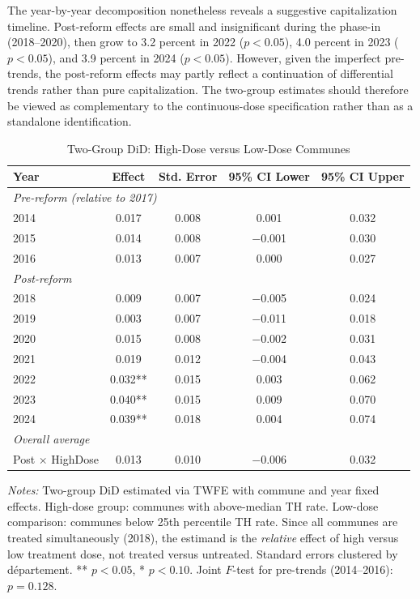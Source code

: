 \documentclass[12pt]{article}
\begin{document}
The year-by-year decomposition nonetheless reveals a suggestive capitalization timeline. Post-reform effects are small and insignificant during the phase-in (2018--2020), then grow to 3.2 percent in 2022 ($p < 0.05$), 4.0 percent in 2023 ($p < 0.05$), and 3.9 percent in 2024 ($p < 0.05$). However, given the imperfect pre-trends, the post-reform effects may partly reflect a continuation of differential trends rather than pure capitalization. The two-group estimates should therefore be viewed as complementary to the continuous-dose specification rather than as a standalone identification.

\begin{table}[H]
\centering
\caption{Two-Group DiD: High-Dose versus Low-Dose Communes}
\label{tab:cs_results}
\begin{tabular}{lcccc}
\toprule
Year & Effect & Std. Error & 95\% CI Lower & 95\% CI Upper \\
\midrule
\multicolumn{5}{l}{\emph{Pre-reform (relative to 2017)}} \\
2014 & 0.017 & 0.008 & 0.001 & 0.032 \\
2015 & 0.014 & 0.008 & $-$0.001 & 0.030 \\
2016 & 0.013 & 0.007 & 0.000 & 0.027 \\
\midrule
\multicolumn{5}{l}{\emph{Post-reform}} \\
2018 & 0.009 & 0.007 & $-$0.005 & 0.024 \\
2019 & 0.003 & 0.007 & $-$0.011 & 0.018 \\
2020 & 0.015 & 0.008 & $-$0.002 & 0.031 \\
2021 & 0.019 & 0.012 & $-$0.004 & 0.043 \\
2022 & 0.032** & 0.015 & 0.003 & 0.062 \\
2023 & 0.040** & 0.015 & 0.009 & 0.070 \\
2024 & 0.039** & 0.018 & 0.004 & 0.074 \\
\midrule
\multicolumn{5}{l}{\emph{Overall average}} \\
Post $\times$ HighDose & 0.013 & 0.010 & $-$0.006 & 0.032 \\
\bottomrule
\end{tabular}
\begin{tablenotes}[flushleft]
\small
\item \emph{Notes:} Two-group DiD estimated via TWFE with commune and year fixed effects. High-dose group: communes with above-median TH rate. Low-dose comparison: communes below 25th percentile TH rate. Since all communes are treated simultaneously (2018), the estimand is the \emph{relative} effect of high versus low treatment dose, not treated versus untreated. Standard errors clustered by d\'{e}partement. ** $p < 0.05$, * $p < 0.10$. Joint $F$-test for pre-trends (2014--2016): $p = 0.128$.
\end{tablenotes}
\end{table}
\end{document}
